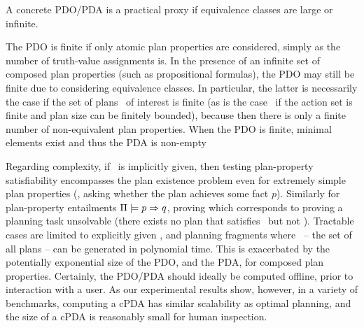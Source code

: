 A concrete PDO/PDA is a practical proxy if equivalence classes are
large or infinite.

The PDO is finite if only atomic plan properties are considered,
simply as the number of truth-value assignments is. In the presence of
an infinite set of composed plan properties (such as propositional
formulas), the PDO may still be finite due to considering equivalence
classes. In particular, the latter is necessarily the case if the set
of plans \plans\ of interest is finite (as is the case \eg\ if the
action set is finite and plan size can be finitely bounded), because
then there is only a finite number of non-equivalent plan properties.
%
When the PDO is finite, minimal elements exist and thus the PDA is
non-empty

Regarding complexity, if \plans\ is implicitly given, then testing
plan-property satisfiability encompasses the plan existence problem
even for extremely simple plan properties (\eg, asking whether the
plan achieves some fact $p$). Similarly for plan-property entailments
$\Pi \models p \Rightarrow q$, proving which corresponds to
proving a planning task unsolvable (there exists no plan that
satisfies \prop\ but not \propq). Tractable cases are limited to
explicitly given \plans, and planning fragments where \plans\ -- the
set of all plans -- can be generated in polynomial time. This is
exacerbated by the potentially exponential size of the PDO, and the
PDA, for composed plan properties. Certainly, the PDO/PDA should
ideally be computed offline, prior to interaction with a user. As our
experimental results show, however, in a variety of benchmarks,
computing a cPDA has similar scalability as optimal planning, and the
size of a cPDA is reasonably small for human inspection.


%
%


